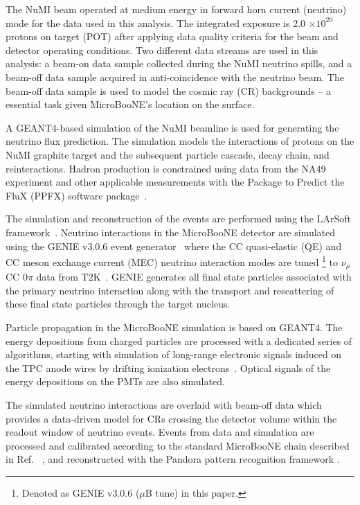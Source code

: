 \documentclass[%
twocolumn,
superscriptaddress,
showpacs,preprintnumbers,
amsmath,amssymb,
aps,
prl,
longbibliography
]{revtex4-1}
\begin{document}
 The NuMI beam operated at medium energy in forward horn current (neutrino) mode for the data used in this analysis. The integrated exposure is 2.0 $\times 10^{20}$ protons on target (POT) after applying data quality criteria for the beam and detector operating conditions.  Two different data streams are used in this analysis: a beam-on data sample collected during the NuMI neutrino spills, and a beam-off data sample acquired in anti-coincidence with the neutrino beam. The beam-off data sample is used to model the cosmic ray (CR) backgrounds -- a essential task given MicroBooNE's location on the surface.

A GEANT4-based \cite{geant} simulation of the NuMI beamline is used for generating the neutrino flux prediction. The simulation models the interactions of protons on the NuMI graphite target and the subsequent particle cascade, decay chain, and reinteractions. Hadron production is constrained using data from the NA49 experiment \cite{Alt2007} and other applicable measurements with the Package to Predict the FluX (PPFX) software package~\cite{Aliaga:2016oaz}. 

The simulation and reconstruction of the events are performed using the LArSoft framework~\cite{larsoft}. Neutrino interactions in the MicroBooNE detector are simulated using the GENIE v3.0.6 event generator~\cite{GENIE} where the CC quasi-elastic (QE) and CC meson exchange current (MEC) neutrino interaction modes are tuned \footnote{Denoted as GENIE v3.0.6 ($\mu$B tune) in this paper.} to $\nu_\mu$ CC 0$\pi$ data from T2K~\cite{PhysRevD.93.112012,themicroboonecollaboration2021new}. GENIE generates all final state particles associated with the primary neutrino interaction along with the transport and rescattering of these final state particles through the target nucleus.

Particle propagation in the MicroBooNE simulation is based on GEANT4. The energy depositions from charged particles are processed with a dedicated series of algorithms, starting with simulation of long-range electronic signals induced on the TPC anode wires by drifting ionization electrons~\cite{signal_process_part1,signal_process_part2}. Optical signals of the energy depositions on the PMTs are also simulated. 

The simulated neutrino interactions are overlaid with beam-off data which provides a data-driven model for CRs crossing the detector volume within the readout window of neutrino events. Events from data and simulation are processed and calibrated according to the standard MicroBooNE chain described in Ref. ~\cite{noise_paper,signal_process_part1,signal_process_part2,MicroBooNE_calibration,showerEn}, and reconstructed with  the Pandora pattern recognition framework \cite{pandora}.
\end{document}
